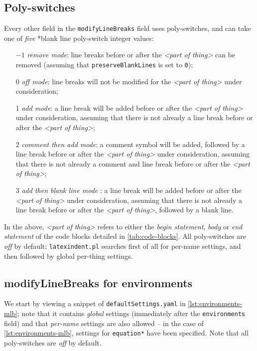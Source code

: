 \subsection{Poly-switches}\label{sec:poly-switches}
	Every other field in the \texttt{modifyLineBreaks} field uses poly-switches, and can take
	one of \emph{five}%
	*{blank line poly-switch} integer values:
	\begin{itemize}[font=\bfseries]
		\item[$-1$] \emph{remove mode}: line breaks before or after the \emph{<part of thing>} can be removed (assuming that \texttt{preserveBlankLines} is set to \texttt{0});
		\item[0] \emph{off mode}: line breaks will not be modified for the \emph{<part of thing>} under consideration;
		\item[1] \emph{add mode}: a line break will be added before or after the \emph{<part of thing>} under consideration, assuming that
		      there is not already a line break before or after the \emph{<part of thing>};
		\item[2] \emph{comment then add mode}: a comment symbol will be added, followed by a line break before or after the \emph{<part of thing>} under consideration, assuming that
		      there is not already a comment and line break before or after the \emph{<part of thing>};
		\item[3] \emph{add then blank line mode}%
		      : a line break will be added before or after the \emph{<part of thing>} under consideration, assuming that
		      there is not already a line break before or after the \emph{<part of thing>}, followed by a blank line.
	\end{itemize}
	In the above, \emph{<part of thing>} refers to either the \emph{begin statement}, \emph{body} or \emph{end statement} of the
	code blocks detailed in \vref{tab:code-blocks}.
	All poly-switches are \emph{off} by default; \texttt{latexindent.pl} searches first of all for per-name settings, and then followed by global per-thing settings.

\subsection{modifyLineBreaks for environments}\label{sec:modifylinebreaks-environments}
	We start by viewing a snippet of \texttt{defaultSettings.yaml} in \cref{lst:environments-mlb}; note that it contains \emph{global} settings (immediately
	after the \texttt{environments} field) and that \emph{per-name} settings are also allowed -- in the case of \cref{lst:environments-mlb}, settings
	for \texttt{equation*} have been specified. Note that all poly-switches are \emph{off} by default.

